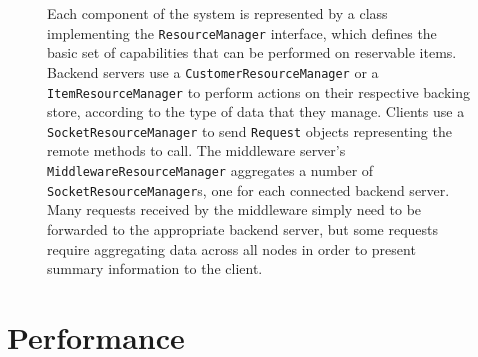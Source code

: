 \documentclass[letterpaper,11pt]{article}
\makeatletter
\newenvironment{customlegend}[1][]{%
    \begingroup
    \csname pgfplots@init@cleared@structures\endcsname
    \pgfplotsset{#1}%
}{%
    \csname pgfplots@createlegend\endcsname
    \endgroup
}%
\def\addlegendimage{\csname pgfplots@addlegendimage\endcsname}
\makeatother
\begin{document}
\begin{figure}[H]
    \centering


    \caption{
        Each component of the system is represented by a class implementing the
        \texttt{ResourceManager} interface, which defines the basic set of
        capabilities that can be performed on reservable items.
        Backend servers use a \texttt{CustomerResourceManager} or a
        \texttt{ItemResourceManager} to perform actions on their respective
        backing store,  according to the type of data that they manage.
        Clients use a \texttt{SocketResourceManager} to send \texttt{Request}
        objects representing the remote methods to call.
        The middleware server's \texttt{MiddlewareResourceManager} aggregates a
        number of \texttt{SocketResourceManager}s, one for each connected
        backend server. Many requests received by the middleware simply need
        to be forwarded to the appropriate backend server, but some requests
        require aggregating data across all nodes in order to present summary
        information to the client.
    }
\end{figure}

\section*{Performance}
\end{document}
